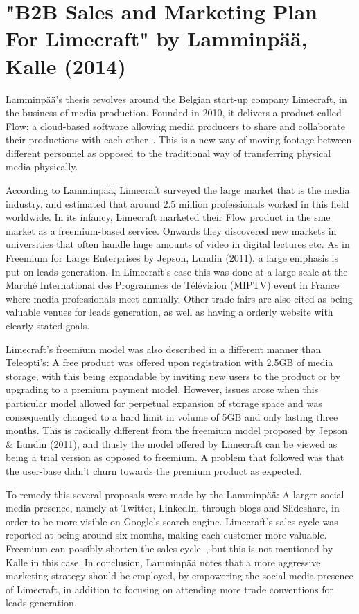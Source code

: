 \section{"B2B Sales and Marketing Plan For Limecraft" by Lamminpää, Kalle (2014)}
Lamminpää's thesis revolves around the Belgian start-up company Limecraft, in the business of media production. Founded in 2010, it delivers a product called Flow; a cloud-based software allowing media producers to share and collaborate their productions with each other~\cite{lamminpaa2014b2b}. This is a new way of moving footage between different personnel as opposed to the traditional way of transferring physical media physically. 


According to Lamminpää, Limecraft surveyed the large market that is the media industry, and estimated that around 2.5 million professionals worked in this field worldwide. In its infancy, Limecraft marketed their Flow product in the \gls{sme} market as a freemium-based service. Onwards they discovered new markets in universities that often handle huge amounts of video in digital lectures etc. As in Freemium for Large Enterprises by Jepson, Lundin (2011), a large emphasis is put on leads generation. In Limecraft's case this was done at a large scale at the  Marché International des Programmes de Télévision (MIPTV) event in France where media professionals meet annually. Other trade fairs are also cited as being valuable venues for leads generation, as well as having a orderly website with clearly stated goals. 


Limecraft's freemium model was also described in a different manner than Teleopti's: A free product was offered upon registration with 2.5GB of media storage, with this being expandable by inviting new users to the product or by upgrading to a premium payment model. However, issues arose when this particular model allowed for perpetual expansion of storage space and was consequently changed to a hard limit in volume of 5GB and only lasting three months. This is radically different from the freemium model proposed by Jepson \& Lundin (2011), and thusly the model offered by Limecraft can be viewed as being a trial version as opposed to freemium. A problem that followed was that the user-base didn't churn towards the premium product as expected. 


To remedy this several proposals were made by the Lamminpää: A larger social media presence, namely at Twitter, LinkedIn, through blogs and Slideshare, in order to be more visible on Google's search engine. Limecraft's sales cycle was reported at being around six months, making each customer more valuable. Freemium can possibly shorten the sales cycle~\cite{davidskokN/A}, but this is not mentioned by Kalle in this case. In conclusion, Lamminpää notes that a more aggressive marketing strategy should be employed, by empowering the social media presence of Limecraft, in addition to focusing on attending more trade conventions for leads generation. 


